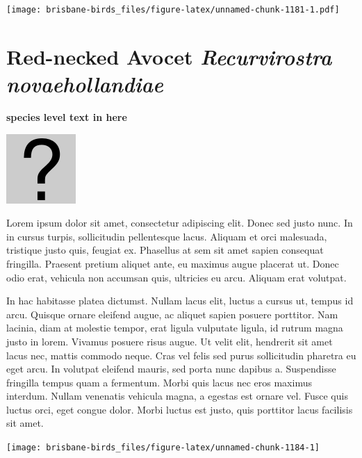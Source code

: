 \documentclass[]{book}
\let\origfigure\figure
\let\endorigfigure\endfigure
\renewenvironment{figure}[1][2] {
  \expandafter\origfigure\expandafter[H]
} {
  \endorigfigure
}
\begin{document}
\begin{figure}
\centering
\texttt{[image: brisbane-birds\_files/figure-latex/unnamed-chunk-1181-1.pdf]}
\caption{\label{fig:unnamed-chunk-1181}insert figure caption}
\end{figure}

\section{\texorpdfstring{Red-necked Avocet \emph{Recurvirostra
novaehollandiae}}{Red-necked Avocet Recurvirostra novaehollandiae}}\label{red-necked-avocet-recurvirostra-novaehollandiae}

\textbf{species level text in here}

\begin{figure}
\centering
\includegraphics{assets/missing.png}
\caption{No image for species}
\end{figure}

Lorem ipsum dolor sit amet, consectetur adipiscing elit. Donec sed justo
nunc. In in cursus turpis, sollicitudin pellentesque lacus. Aliquam et
orci malesuada, tristique justo quis, feugiat ex. Phasellus at sem sit
amet sapien consequat fringilla. Praesent pretium aliquet ante, eu
maximus augue placerat ut. Donec odio erat, vehicula non accumsan quis,
ultricies eu arcu. Aliquam erat volutpat.

In hac habitasse platea dictumst. Nullam lacus elit, luctus a cursus ut,
tempus id arcu. Quisque ornare eleifend augue, ac aliquet sapien posuere
porttitor. Nam lacinia, diam at molestie tempor, erat ligula vulputate
ligula, id rutrum magna justo in lorem. Vivamus posuere risus augue. Ut
velit elit, hendrerit sit amet lacus nec, mattis commodo neque. Cras vel
felis sed purus sollicitudin pharetra eu eget arcu. In volutpat eleifend
mauris, sed porta nunc dapibus a. Suspendisse fringilla tempus quam a
fermentum. Morbi quis lacus nec eros maximus interdum. Nullam venenatis
vehicula magna, a egestas est ornare vel. Fusce quis luctus orci, eget
congue dolor. Morbi luctus est justo, quis porttitor lacus facilisis sit
amet.

\begin{figure}
\texttt{[image: brisbane-birds\_files/figure-latex/unnamed-chunk-1184-1]} \caption{insert figure caption}\label{fig:unnamed-chunk-1184}
\end{figure}
\end{document}
